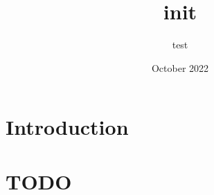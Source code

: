 \documentclass{article}
\title{init}
\author{test}
\date{October 2022}
\begin{document}
\maketitle

\section{Introduction}

\section{TODO}

\end{document}
